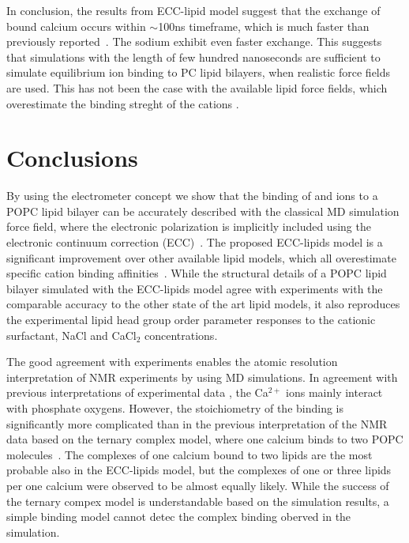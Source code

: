 \documentclass[aip,jcp,twocolumn]{revtex4}
\begin{document}
In conclusion, the results from ECC-lipid model suggest that the
exchange of bound calcium occurs within $\sim$100ns timeframe,
which is much faster than previously reported~\cite{javanainen17}.
The sodium exhibit even faster exchange.
This suggests that simulations with the length of few hundred
nanoseconds are sufficient to simulate equilibrium ion binding
to PC lipid bilayers, when realistic force fields are used.
This has not been the case with the available lipid force fields,
which overestimate the binding streght of the cations \cite{javanainen17,catte16}.








\section{Conclusions}

By using the electrometer concept we show that the binding of  and  ions
to a POPC lipid bilayer can be accurately described with the classical MD simulation 
force field, where the electronic polarization is implicitly included using 
the electronic continuum correction (ECC)~\cite{leontyev11}.
The proposed ECC-lipids model is a significant improvement over 
other available lipid models, which all overestimate specific cation binding affinities~\cite{catte16}.  
While the structural details of a POPC lipid bilayer simulated with the ECC-lipids
model agree with experiments with the comparable accuracy to the other state of the art lipid models,
it also reproduces the experimental lipid head group order parameter responses to
the cationic surfactant, NaCl and CaCl$_2$ concentrations. 

The good agreement with experiments enables the atomic resolution 
interpretation of NMR experiments by using MD simulations.
In agreement with previous interpretations of experimental data \cite{hauser76,hauser78,herbette84,binder02},
the Ca$^{2+}$ ions mainly interact with phosphate oxygens.
However, the stoichiometry of the binding is significantly more complicated 
than in the previous interpretation of the NMR data based on 
the ternary complex model, where one calcium binds to two POPC molecules~\cite{altenbach84}.
The complexes of one calcium bound to two lipids are the most probable also in the
ECC-lipids model, but the complexes of one or three lipids per one calcium
were observed to be almost equally likely. While the success of the ternary
compex model is understandable based on the simulation results,
a simple binding model cannot detec the complex binding
oberved in the simulation.
\end{document}
